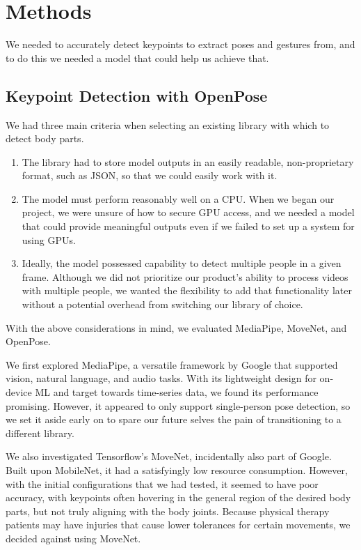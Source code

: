 \section{Methods}
\label{sec:methods}

\indent We needed to accurately detect keypoints to extract poses and gestures from, and to do this we needed a model that could help us achieve that. 

\subsection{Keypoint Detection with OpenPose}
\indent We had three main criteria when selecting an existing library with which to detect body parts.
\begin{enumerate}
    \item The library had to store model outputs in an easily readable, non-proprietary format, such as JSON, 
    so that we could easily work with it.
    \item The model must perform reasonably well on a CPU. When we began our project, we were unsure of how 
    to secure GPU access, and we needed a model that could provide meaningful outputs even if we failed to 
    set up a system for using GPUs.
    \item Ideally, the model possessed capability to detect multiple people in a given frame. Although we did 
    not prioritize our product’s ability to process videos with multiple people, we wanted the flexibility to 
    add that functionality later without a potential overhead from switching our library of choice.
\end{enumerate}
\indent With the above considerations in mind, we evaluated MediaPipe, MoveNet, and OpenPose.

\indent We first explored MediaPipe, a versatile framework by Google that supported vision, natural language, and audio 
tasks. With its lightweight design for on-device ML and target towards time-series data, we found its performance 
promising. However, it appeared to only support single-person pose detection, so we set it aside early on to 
spare our future selves the pain of transitioning to a different library.
	
\indent We also investigated Tensorflow’s MoveNet, incidentally also part of Google. Built upon MobileNet, it had a 
satisfyingly low resource consumption. However, with the initial configurations that we had tested, it seemed to 
have poor accuracy, with keypoints often hovering in the general region of the desired body parts, but not truly 
aligning with the body joints. Because physical therapy patients may have injuries that cause lower tolerances 
for certain movements, we decided against using MoveNet.
	
